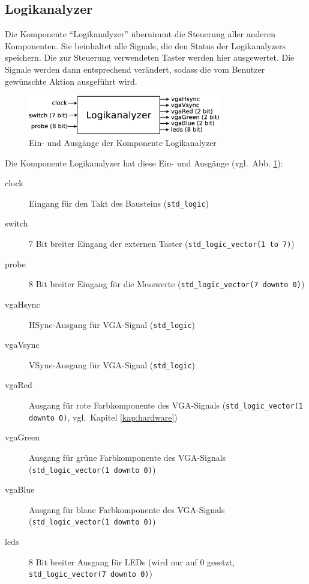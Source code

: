 \documentclass[IN,ngerman,utf8,12pt]{tumbook}
\newcommand{\vgl}{vgl.\ }
\begin{document}
\subsection{Logikanalyzer}
Die Komponente ``Logikanalyzer'' übernimmt die Steuerung aller anderen Komponenten.
Sie beinhaltet alle Signale, die den Status der Logikanalyzers speichern.
Die zur Steuerung verwendeten Taster werden hier ausgewertet.
Die Signale werden dann entsprechend verändert, sodass die vom Benutzer gewünschte Aktion ausgeführt wird.

\begin{figure}[H]
    \centerline{
        \includegraphics[width=0.75\textwidth]{img/logikanalyzer}
    }
    \label{abb:logikanalyzer}
    \caption{Ein- und Ausgänge der Komponente Logikanalyzer}
\end{figure}

Die Komponente Logikanalyzer hat diese Ein- und Ausgänge (\vgl Abb. \ref{abb:logikanalyzer}):
\begin{description}
    \item[clock] Eingang für den Takt des Bausteins (\texttt{std\_logic})
    \item[switch] 7 Bit breiter Eingang der externen Taster (\texttt{std\_logic\_vector(1 to 7)})
    \item[probe] 8 Bit breiter Eingang für die Messwerte (\texttt{std\_logic\_vector(7 downto 0)})
    \item[vgaHsync] HSync-Ausgang für VGA-Signal (\texttt{std\_logic})
    \item[vgaVsync] VSync-Ausgang für VGA-Signal (\texttt{std\_logic})
    \item[vgaRed] Ausgang für rote Farbkomponente des VGA-Signals (\texttt{std\_logic\_vector(1 downto 0)}, \vgl Kapitel \ref{kap:hardware})
    \item[vgaGreen] Ausgang für grüne Farbkomponente des VGA-Signals (\texttt{std\_logic\_vector(1 downto 0)})
    \item[vgaBlue] Ausgang für blaue Farbkomponente des VGA-Signals (\texttt{std\_logic\_vector(1 downto 0)})
    \item[leds] 8 Bit breiter Ausgang für LEDs (wird nur auf 0 gesetzt, \texttt{std\_logic\_vector(7 downto 0)})
\end{description}
\end{document}
